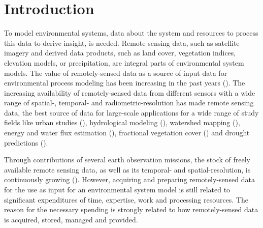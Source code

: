 \chapter{Introduction}


To model environmental systems, data about the system  and resources to process this data to derive insight, is needed. Remote sensing data, such as satellite imagery and derived data products, such as land cover, vegetation indices, elevation models, or precipitation, are integral parts of environmental system models. 
The value of remotely-sensed data as a source of input data for environmental process modeling has been increasing in the past years (\cite{melesse2007remote}). The increasing availability of remotely-sensed data from different sensors with a wide range of spatial-, temporal- and radiometric-resolution has made remote sensing data, the best source of data for large-scale applications for a wide range of study fields like urban studies (\cite{wu2000global}), hydrological modeling (\cite{bogh2004incorporating}), watershed mapping (\cite{melesse2003spatially}), energy and water flux estimation (\cite{melesse2005estimation}), fractional vegetation cover (\cite{carlson2000impact}) and drought predictions (\cite{rhee2010monitoring}).

Through contributions of several earth observation missions, the stock of freely available remote sensing data, as well as its temporal- and spatial-resolution, is continuously growing (\cite{melesse2007remote}).
However, acquiring and preparing remotely-sensed data for the use as input for an environmental system model is still related to significant expenditures of time, expertise, work and processing resources. The reason for the necessary spending is strongly related to how remotely-sensed data is acquired, stored, managed and provided.


